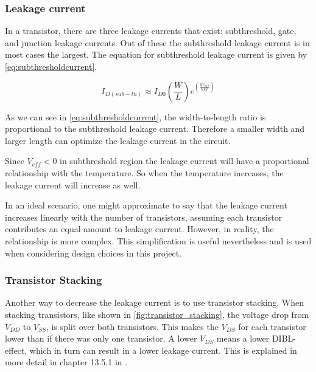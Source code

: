 \subsubsection{Leakage current}

In a transistor, there are three leakage currents that exist: subthreshold, gate, and
junction leakage currents. Out of these the subthreshold leakage current is in most cases the largest.\cite[p.49]{Analog_integrated} The equation for subthreshold leakage current is given by \autoref{eq:subthresholdcurrent}.\cite[p.42]{Analog_integrated}

\begin{equation}
    \label{eq:subthresholdcurrent}
    I_{D(sub-th)} \approx I_{D0}\left(\frac{W}{L}\right)e^{\left(\frac{qV_{eff}}{nkT}\right)}
\end{equation}

As we can see in \autoref{eq:subthresholdcurrent}, the width-to-length ratio is proportional to the subthreshold leakage current. Therefore a smaller width and larger length can optimize the leakage current in the circuit.

Since $V_{eff} < 0$ in subthreshold region the leakage current will have a proportional relationship with the temperature. So when the temperature increases, the leakage current will increase as well. 

In an ideal scenario, one might approximate to say that the leakage current increases linearly with the number of transistors, assuming each transistor contributes an equal amount to leakage current. However, in reality, the relationship is more complex. This simplification is useful nevertheless and is used when considering design choices in this project.

\subsubsection{Transistor Stacking}
Another way to decrease the leakage current is to use transistor stacking. When stacking transistors, like shown in \autoref{fig:transistor_stacking}, the voltage drop from $V_{DD}$ to $V_{SS}$, is split over both transistors. This makes the $V_{DS}$ for each transistor lower than if there was only one transistor. A lower $V_{DS}$ means a lower DIBL-effect, which in turn can result in a lower leakage current. This is explained in more detail in chapter 13.5.1 in \cite{transistor_stacking}.


